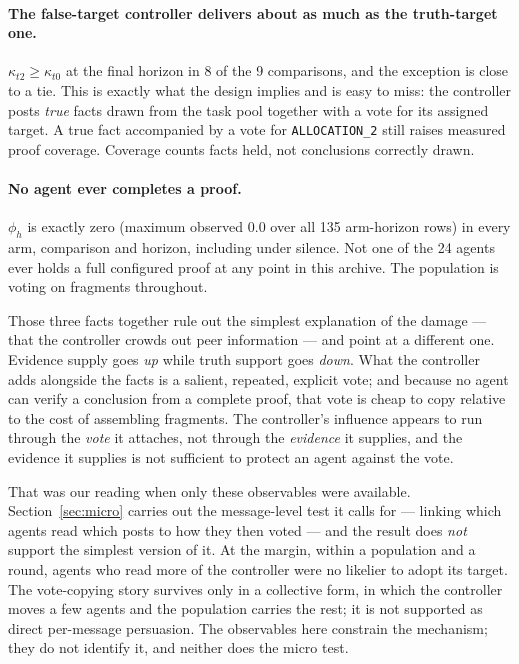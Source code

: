 \documentclass[11pt]{article}
\begin{document}
\paragraph{The false-target controller delivers about as much as the truth-target one.}
$\kappa_{t2}\ge\kappa_{t0}$ at the final horizon in 8 of the 9
comparisons, and the exception is close to a tie. This is exactly what
the design implies and is easy to miss: the controller posts \emph{true} facts drawn from
the task pool together with a vote for its assigned target. A true fact accompanied by a vote
for \texttt{ALLOCATION\_2} still raises measured proof coverage. Coverage counts facts held,
not conclusions correctly drawn.

\paragraph{No agent ever completes a proof.} $\phi_h$ is exactly zero (maximum observed
0.0 over all 135 arm-horizon rows) in every arm, comparison and horizon,
including under silence. Not one of the 24 agents ever holds a
full configured proof at any point in this archive. The population is voting on fragments
throughout.

Those three facts together rule out the simplest explanation of the damage --- that the
controller crowds out peer information --- and point at a different one. Evidence supply goes
\emph{up} while truth support goes \emph{down}. What the controller adds alongside the facts
is a salient, repeated, explicit vote; and because no agent can verify a conclusion from a
complete proof, that vote is cheap to copy relative to the cost of assembling fragments. The
controller's influence appears to run through the \emph{vote} it attaches, not through the
\emph{evidence} it supplies, and the evidence it supplies is not sufficient to protect an
agent against the vote.

That was our reading when only these observables were available. Section~\ref{sec:micro}
carries out the message-level test it calls for --- linking which agents read which posts to
how they then voted --- and the result does \emph{not} support the simplest version of it. At
the margin, within a population and a round, agents who read more of the controller were no
likelier to adopt its target. The vote-copying story survives only in a collective form, in
which the controller moves a few agents and the population carries the rest; it is not
supported as direct per-message persuasion. The observables here constrain the mechanism;
they do not identify it, and neither does the micro test.
\end{document}
